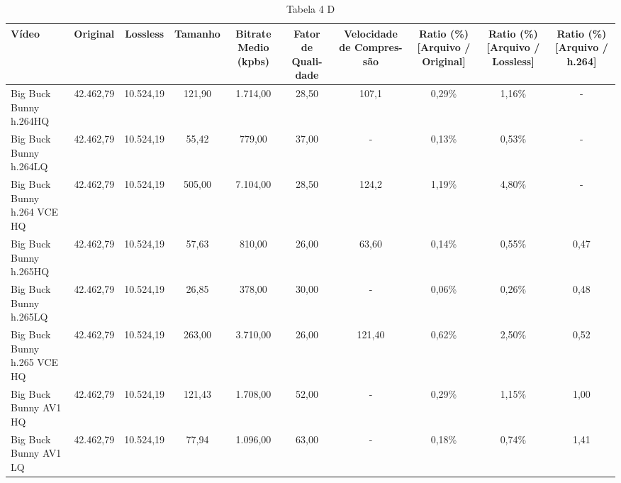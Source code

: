 \begin{table}[H]
    \centering
    \caption{Tabela 4 D}
    \label{tab:tabela4d}
    \footnotesize
    \begin{tabularx}{\textwidth}{X|C|C|C|C|C|C|C|C|C}
        \hline
        
        Vídeo & Original & Lossless & Tamanho & Bitrate Medio (kpbs) & Fator de Quali- dade & Velocidade de Compres- são & Ratio (\%) [Arquivo / Original] & Ratio (\%) [Arquivo / Lossless] & Ratio (\%) [Arquivo / h.264] \\ \hline
        Big Buck Bunny h.264HQ & 42.462,79 & 10.524,19 & 121,90 & 1.714,00 & 28,50 & 107,1 & 0,29\% & 1,16\% & - \\ \hline
        Big Buck Bunny h.264LQ & 42.462,79 & 10.524,19 & 55,42 & 779,00 & 37,00 & - & 0,13\% & 0,53\% & - \\ \hline
        Big Buck Bunny h.264 VCE HQ & 42.462,79 & 10.524,19 & 505,00 & 7.104,00 & 28,50 & 124,2 & 1,19\% & 4,80\% & - \\ \hline
        Big Buck Bunny h.265HQ & 42.462,79 & 10.524,19 & 57,63 & 810,00 & 26,00 & 63,60 & 0,14\% & 0,55\% & 0,47 \\ \hline
        Big Buck Bunny h.265LQ & 42.462,79 & 10.524,19 & 26,85 & 378,00 & 30,00 & - & 0,06\% & 0,26\% & 0,48 \\ \hline
        Big Buck Bunny h.265 VCE HQ & 42.462,79 & 10.524,19 & 263,00 & 3.710,00 & 26,00 & 121,40 & 0,62\% & 2,50\% & 0,52 \\ \hline
        Big Buck Bunny AV1 HQ & 42.462,79 & 10.524,19 & 121,43 & 1.708,00 & 52,00 & - & 0,29\% & 1,15\% & 1,00 \\ \hline
        Big Buck Bunny AV1 LQ & 42.462,79 & 10.524,19 & 77,94 & 1.096,00 & 63,00 & - & 0,18\% & 0,74\% & 1,41 \\ \hline
    \end{tabularx}

    \autoriaPropria
\end{table}


